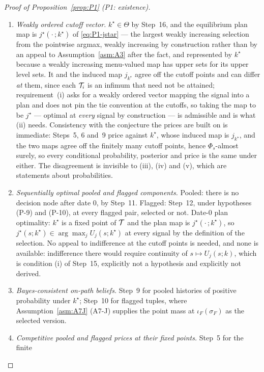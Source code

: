 \begin{proof}[Proof of Proposition~\ref{prop:P1} (P1: existence)]
\begin{enumerate}[label=(\roman*),leftmargin=2.4em,itemsep=3pt]
\item \emph{Weakly ordered cutoff vector.} $k^\star \in \Theta$ by Step~16, and the equilibrium plan
  map is $j^\star(\cdot\,;k^\star)$ of \eqref{eq:P1-jstar} --- the largest weakly increasing selection
  from the pointwise argmax, weakly increasing by construction rather than by an appeal to
  Assumption~\ref{asm:A3} after the fact, and represented by $k^\star$ because a weakly increasing
  menu-valued map has upper sets for its upper level sets. It and the induced map $j_{k^\star}$ agree
  off the cutoff points and can differ \emph{at} them, since each $\mathcal{T}_i$ is an infimum that need
  not be attained; requirement~(i) asks for a weakly ordered vector mapping the signal into a plan and
  does not pin the tie convention at the cutoffs, so taking the map to be $j^\star$ --- optimal at
  \emph{every} signal by construction --- is admissible and is what (ii) needs. Consistency with the
  conjecture the prices are built on is immediate: Steps~5, 6 and~9 price against $k^\star$, whose
  induced map is $j_{k^\star}$, and the two maps agree off the finitely many cutoff points, hence
  $\Phi_s$-almost surely, so every conditional probability, posterior and price is the same under
  either. The disagreement is invisible to (iii), (iv) and (v), which are statements about
  probabilities.
\item \emph{Sequentially optimal pooled and flagged components.} Pooled: there is no decision node
  after date $0$, by Step~11. Flagged: Step~12, under hypotheses (P-9) and (P-10), at every flagged
  pair, selected or not. Date-$0$ plan optimality: $k^\star$ is a fixed point of $\mathcal{T}$ and the plan
  map is $j^\star(\cdot\,;k^\star)$, so $j^\star(s;k^\star) \in \arg\max_j U_j(s;k^\star)$ at every
  signal by the definition of the selection. No appeal to indifference at the cutoff points is
  needed, and none is available: indifference there would require continuity of
  $s \mapsto U_j(s;k)$, which is condition (i) of Step~15, explicitly not a hypothesis and explicitly
  not derived.
\item \emph{Bayes-consistent on-path beliefs.} Step~9 for pooled histories of positive probability
  under $k^\star$; Step~10 for flagged tuples, where Assumption~\ref{asm:A7J} (A7-J) supplies the point mass
  at $\iota_F(\sigma_F)$ as the selected version.
\item \emph{Competitive pooled and flagged prices at their fixed points.} Step~5 for the finite

\end{enumerate}
\end{proof}
